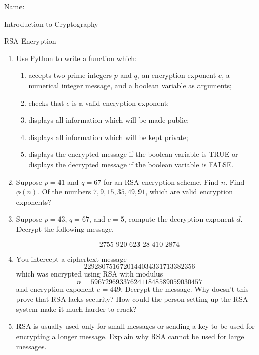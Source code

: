 \documentclass[12pt]{amsart}
\theoremstyle{definition}
\theoremstyle{remark}
\numberwithin{equation}{section}
\begin{document}
\begin{flushright}
Name:\_\_\_\_\_\_\_\_\_\_\_\_\_\_\_\_\_\_\_\_\_\_\_
\end{flushright}
\vspace{10pt}
\begin{center}
Introduction to Cryptography

RSA Encryption
\end{center}



\begin{enumerate}
\item Use Python to write a function which:
\begin{enumerate}
\item accepts two prime integers $p$ and $q$, an encryption exponent $e$, a numerical integer message, and a boolean variable as arguments;
\item checks that $e$ is a valid encryption exponent;
\item displays all information which will be made public;
\item displays all information which will be kept private;
\item displays the encrypted message if the boolean variable is TRUE or displays the decrypted message if the boolean variable is FALSE.
\end{enumerate}

\item Suppose $p=41$ and $q=67$ for an RSA encryption scheme. Find $n$. Find $\phi(n)$. Of the numbers $7,9,15,35,49,91$, which are valid encryption exponents?

\item Suppose $p=43$, $q=67$, and $e=5$, compute the decryption exponent $d$. Decrypt the following message.

$$\text{2755 920 623 28 410 2874}$$


\item You intercept a ciphertext message $$\text{2292807516720144034331713382356}$$ which was encrypted using RSA with modulus $$n=5967296933762411848589059030457$$ and encryption exponent $e=449$. Decrypt the message. Why doesn't this prove that RSA lacks security? How could the person setting up the RSA system make it much harder to crack?

\item RSA is usually used only for small messages or sending a key to be used for encrypting a longer message. Explain why RSA cannot be used for large messages.


\end{enumerate}
\end{document}
